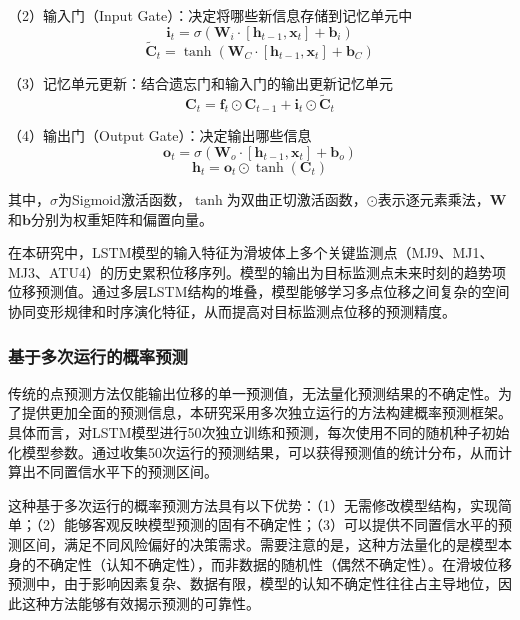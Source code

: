 \documentclass[12pt,a4paper]{article}
\begin{document}
（2）输入门（Input Gate）：决定将哪些新信息存储到记忆单元中
\begin{equation}
\mathbf{i}_t = \sigma(\mathbf{W}_i \cdot [\mathbf{h}_{t-1}, \mathbf{x}_t] + \mathbf{b}_i)
\label{eq:input-gate}
\end{equation}
\begin{equation}
\tilde{\mathbf{C}}_t = \tanh(\mathbf{W}_C \cdot [\mathbf{h}_{t-1}, \mathbf{x}_t] + \mathbf{b}_C)
\label{eq:candidate}
\end{equation}

（3）记忆单元更新：结合遗忘门和输入门的输出更新记忆单元
\begin{equation}
\mathbf{C}_t = \mathbf{f}_t \odot \mathbf{C}_{t-1} + \mathbf{i}_t \odot \tilde{\mathbf{C}}_t
\label{eq:cell-update}
\end{equation}

（4）输出门（Output Gate）：决定输出哪些信息
\begin{equation}
\mathbf{o}_t = \sigma(\mathbf{W}_o \cdot [\mathbf{h}_{t-1}, \mathbf{x}_t] + \mathbf{b}_o)
\label{eq:output-gate}
\end{equation}
\begin{equation}
\mathbf{h}_t = \mathbf{o}_t \odot \tanh(\mathbf{C}_t)
\label{eq:hidden-state}
\end{equation}

其中，$\sigma$为Sigmoid激活函数，$\tanh$为双曲正切激活函数，$\odot$表示逐元素乘法，$\mathbf{W}$和$\mathbf{b}$分别为权重矩阵和偏置向量。

在本研究中，LSTM模型的输入特征为滑坡体上多个关键监测点（MJ9、MJ1、MJ3、ATU4）的历史累积位移序列。模型的输出为目标监测点未来时刻的趋势项位移预测值。通过多层LSTM结构的堆叠，模型能够学习多点位移之间复杂的空间协同变形规律和时序演化特征，从而提高对目标监测点位移的预测精度。

\subsubsection{基于多次运行的概率预测}

传统的点预测方法仅能输出位移的单一预测值，无法量化预测结果的不确定性。为了提供更加全面的预测信息，本研究采用多次独立运行的方法构建概率预测框架。具体而言，对LSTM模型进行50次独立训练和预测，每次使用不同的随机种子初始化模型参数。通过收集50次运行的预测结果，可以获得预测值的统计分布，从而计算出不同置信水平下的预测区间。

这种基于多次运行的概率预测方法具有以下优势：（1）无需修改模型结构，实现简单；（2）能够客观反映模型预测的固有不确定性；（3）可以提供不同置信水平的预测区间，满足不同风险偏好的决策需求。需要注意的是，这种方法量化的是模型本身的不确定性（认知不确定性），而非数据的随机性（偶然不确定性）。在滑坡位移预测中，由于影响因素复杂、数据有限，模型的认知不确定性往往占主导地位，因此这种方法能够有效揭示预测的可靠性。
\end{document}
